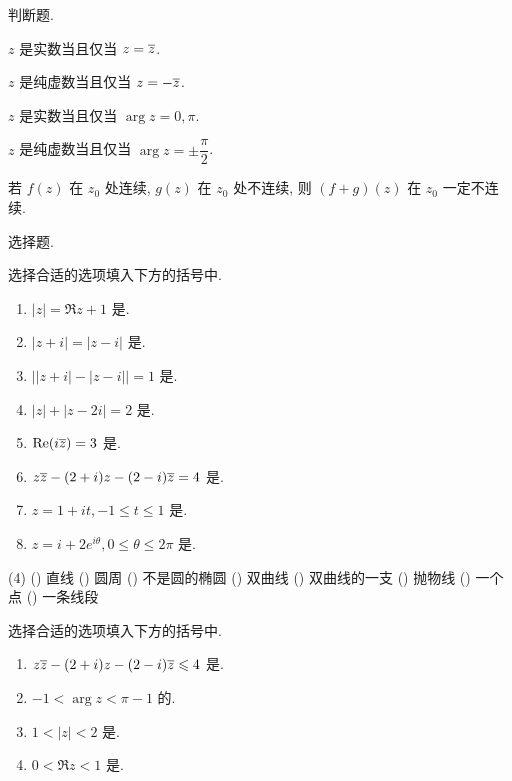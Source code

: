 \sectionHomework
\begin{homework}
  \item 判断题.
    \begin{exlist}
      \item $z$ 是实数当且仅当 $z=\overline z$. \fillbrace{}
      \item $z$ 是纯虚数当且仅当 $z=-\overline z$. \fillbrace{}
      \item $z$ 是实数当且仅当 $\arg z=0,\pi$. \fillbrace{}
      \item $z$ 是纯虚数当且仅当 $\arg z=\pm\dfrac\pi2$. \fillbrace{}
      \item 若 $f(z)$ 在 $z_0$ 处连续, $g(z)$ 在 $z_0$ 处不连续, 则 $(f+g)(z)$ 在 $z_0$ 一定不连续. \fillbrace{}
    \end{exlist}
  \item 选择题.
    \begin{exlist}
      \item 选择合适的选项填入下方的括号中.
      \begin{enumerate}
        \item $|z|=\Re z+1$ 是\fillbrace{}.
        \item $|z+i|=|z-i|$ 是\fillbrace{}.
        \item $\bigl||z+i|-|z-i|\bigr|=1$ 是\fillbrace{}.
        \item $|z|+|z-2i|=2$ 是\fillbrace{}.
        \item $\operatorname{Re}(i\overline z)=3$ 是\fillbrace{}.
        \item $z\overline z-(2+i)z-(2-i)\overline z=4$ 是\fillbrace{}.
        \item $z=1+it,-1\le t\le 1$ 是\fillbrace{}.
        \item $z=i+2e^{i\theta},0\le \theta\le 2\pi$ 是\fillbrace{}.
      \end{enumerate}
        \begin{taskschoice}(4)
          () 直线
          () 圆周
          () 不是圆的椭圆
          () 双曲线
          () 双曲线的一支
          () 抛物线
          () 一个点
          () 一条线段
        \end{taskschoice}
      \item 选择合适的选项填入下方的括号中.
      \begin{enumerate}
        \item $z\overline z-(2+i)z-(2-i)\overline z\leqslant 4$ 是\fillbrace{}.
        \item $-1<\arg z<\pi-1$ 的\fillbrace{}.
        \item $1<|z|<2$ 是\fillbrace{}.
        \item $0<\Re z<1$ 是\fillbrace{}.

\end{enumerate}
\end{exlist}
\end{homework}
